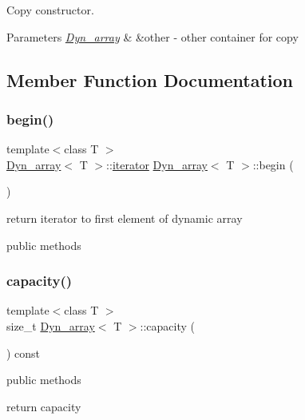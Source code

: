 Copy constructor. 


\begin{DoxyParams}{Parameters}
{\em \hyperlink{classDyn__array}{Dyn\+\_\+array}} & \&other -\/ other container for copy \\
\hline
\end{DoxyParams}


\subsection{Member Function Documentation}
\mbox{\label{classDyn__array_ad6191fc9efb3505a13de70bc0cc5db3e}} 
\subsubsection{\texorpdfstring{begin()}{begin()}}
{\footnotesize\ttfamily template$<$class T $>$ \\
\hyperlink{classDyn__array}{Dyn\+\_\+array}$<$ T $>$\+::\hyperlink{classDyn__array_1_1iterator}{iterator} \hyperlink{classDyn__array}{Dyn\+\_\+array}$<$ T $>$\+::begin (\begin{DoxyParamCaption}{ }\end{DoxyParamCaption})}



return iterator to first element of dynamic array 

public methods \mbox{\label{classDyn__array_a36c5289ec13ee40366fe3b095b2347bf}} 
\subsubsection{\texorpdfstring{capacity()}{capacity()}}
{\footnotesize\ttfamily template$<$class T $>$ \\
size\+\_\+t \hyperlink{classDyn__array}{Dyn\+\_\+array}$<$ T $>$\+::capacity (\begin{DoxyParamCaption}{ }\end{DoxyParamCaption}) const}



public methods 

return capacity \mbox{\label{classDyn__array_a4b261db6ebc4b4b13136e262c955c71a}} 
